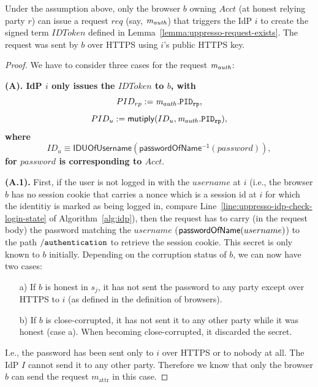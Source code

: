   \begin{lemma}\label{lemma:b-trigger-request}%
    Under the assumption above, only the browser $b$ owning $Acct$ (at honest relying party $r$) can issue a request $req$ (say, $\mathit{m_{auth}}$) that triggers the IdP $i$ to create the signed term $IDToken$ defined in Lemma~\ref{lemma:uppresso-request-exists}. The request was sent by $b$ over HTTPS using $i$'s public HTTPS key.
  \end{lemma}
  \begin{proof}
    We have to consider three cases for the request $\mathit{m_{auth}}$:
  
    \textbf{(A). IdP $i$ only issues the $IDToken$ to $b$, with
    $$ PID_{rp} := \mathit{m_{auth}.\mathtt{PID_{rp}}}, $$ 
    $$ PID_u := \mathsf{mutiply}(ID_u, \mathit{m_{auth}.\mathtt{PID_{rp}}}), $$ 
    where 
    $$ ID_u \equiv \mathsf{IDUOfUsername} (\mathsf{passwordOfName^{-1}}(password)), $$ 
  for $password$ is corresponding to $Acct$}.
    
    \textbf{(A.1).} First, if the user is not logged in with the    $username$ at $i$ (i.e., the browser $b$ has no session cookie that carries a nonce which is a session id at $i$ for which the identitiy is marked as being logged in, compare Line~\ref{line:uppresso-idp-check-login-state} of Algorithm~\ref{alg:idp}), then the request has to carry (in the request body) the password matching the $username$    ($\mathsf{passwordOfName}(username)$) to the path $\mathtt{/authentication}$ to retrieve the session cookie. This secret is only known to $b$ initially. Depending on the corruption status of $b$, we can now have two cases:
    \begin{enumerate}
    \item[a)] If $b$ is honest in $s_j$, it has not sent the 
      password to any party except over HTTPS to $i$ (as defined 
      in the definition of browsers). 
    \item[b)] If $b$ is close-corrupted, it has not sent it to 
      any other party while it was honest (case a). When 
      becoming close-corrupted, it discarded the secret.
    \end{enumerate}
  
    I.e., the password has been sent only to $i$ over HTTPS or 
    to nobody at all. The IdP $I$ cannot send it to any other 
    party. Therefore we know that only the browser $b$ can send 
    the request $m_\text{attr}$ in this case.
  

\end{proof}
